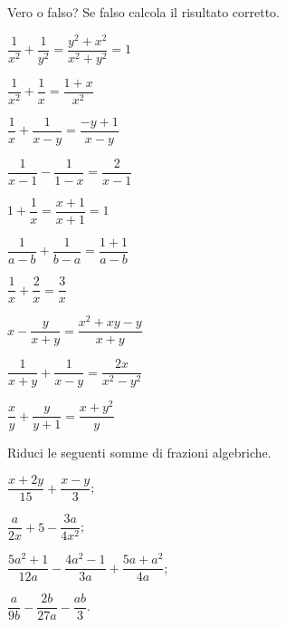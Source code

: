 \begin{esercizio}
\label{ese:14.21}
Vero o falso? Se falso calcola il risultato corretto.
\begin{multicols}{2}
\TabPositions{4cm}
\begin{enumeratea}
 \item $\dfrac{1}{x^{2}}+\dfrac{1}{y^{2}}=\dfrac{y^{2}+x^{2}}{x^{2}+y^{2}}=1$ \tab\boxV\quad\boxF
 \item $\dfrac{1}{x^{2}}+\dfrac{1}{x}=\dfrac{1+x}{x^{2}}$ \tab\boxV\quad\boxF
 \item $\dfrac{1}{x}+\dfrac{1}{x-y}=\dfrac{-y+1}{x-y}$ \tab\boxV\quad\boxF
 \item $\dfrac{1}{x-1}-\dfrac{1}{1-x}=\dfrac{2}{x-1}$ \tab\boxV\quad\boxF
 \item $1+\dfrac{1}{x}=\dfrac{x+1}{x+1}=1$ \tab\boxV\quad\boxF
 \item $\dfrac{1}{a-b}+\dfrac{1}{b-a}=\dfrac{1+1}{a-b}$ \tab\boxV\quad\boxF
 \item $\dfrac{1}{x}+\dfrac{2}{x}=\dfrac{3}{x}$ \tab\boxV\quad\boxF
 \item $x-\dfrac{y}{x+y}=\dfrac{x^{2}+xy-y}{x+y}$ \tab\boxV\quad\boxF
 \item $\dfrac{1}{x+y}+\dfrac{1}{x-y}=\dfrac{2x}{x^{2}-y^{2}}$ \tab\boxV\quad\boxF
 \item $\dfrac{x}{y}+\dfrac{y}{y+1}=\dfrac{x+y^{2}}{y}$ \tab\boxV\quad\boxF
\end{enumeratea}
\end{multicols}
\end{esercizio}

\begin{esercizio}[\Ast]
\label{ese:14.22}
Riduci le seguenti somme di frazioni algebriche.
\begin{multicols}{2}
\begin{enumeratea}
 \item $\dfrac{x+2y}{15}+\dfrac{x-y}{3}$;
 \item $\dfrac{a}{2x}+5-\dfrac{3a}{4x^{2}}$;
 \item $\dfrac{5a^{2}+1}{12a}-\dfrac{4a^{2}-1}{3a}+\dfrac{5a+a^{2}}{4a}$;
 \item $\dfrac{a}{9b}-\dfrac{2b}{27a}-\dfrac{ab}{3}$.
\end{enumeratea}
\end{multicols}
\end{esercizio}
\pagebreak

